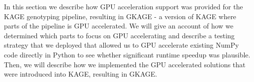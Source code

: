 In this section we describe how GPU acceleration support was provided for the KAGE genotyping pipeline, resulting in GKAGE - a version of KAGE where parts of the pipeline is GPU accelerated.
We will give an account of how we determined which parts to focus on GPU accelerating and describe a testing strategy that we deployed that allowed us to GPU accelerate existing NumPy code directly in Python to see whether significant runtime speedup was plausible.
Then, we will describe how we implemented the GPU accelerated solutions that were introduced into KAGE, resulting in GKAGE.

